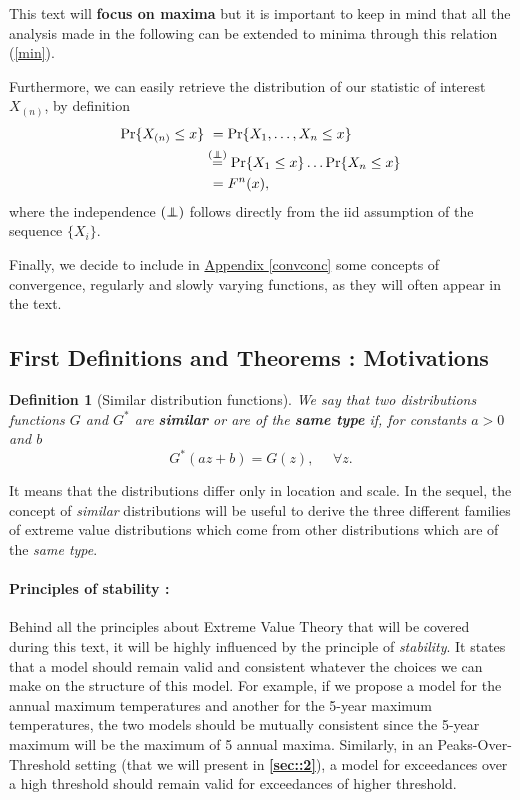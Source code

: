 \documentclass[11pt,a4paper,openany ]{book}
\newcommand\independent{\protect\mathpalette{\protect\independenT}{\perp}}
\def\independenT#1#2{\mathrel{\rlap{$#1#2$}\mkern2mu{#1#2}}}
\newtheorem{definition}{Definition}[chapter]
\begin{document}
This text will \textbf{focus on maxima} but it is important to keep in mind that all the analysis made in the following can be extended to minima through this relation (\ref{min}).

Furthermore, we can easily retrieve the distribution of our statistic of interest $X_{(n)}$, by definition
\begin{equation}\label{maxdist}
\begin{aligned}
\text{Pr}\{X_{(n)}\leq x\} & \ =\text{Pr}\{X_1,\dots,X_n\leq x\} \\ &\stackrel{(\independent)}{=}\text{Pr}\{X_1\leq x\}\dots\text{Pr}\{X_n\leq x\} \\
&\ =F^n(x),
\end{aligned}
\end{equation}
where the independence $(\independent)$  follows directly from the iid assumption of the sequence $\{X_i\}$.


Finally, we decide to include in \hyperref[convconc]{Appendix \ref{convconc}} some concepts of convergence, regularly and slowly varying functions, as they will often 
appear in the text.


\subsection*{First Definitions and Theorems : Motivations}
\theoremstyle{definition}
\begin{definition}[Similar distribution functions]\label{similardf} We say that two distributions functions $G$ and $G^*$ are \emph{\textbf{similar}} or are of the \emph{\textbf{same type}}
	if, for constants $a>0$ and $b$
	\begin{equation}\label{simm}
	G^*(az+b)=G(z), \ \ \ \ \ \ \forall z.
	\end{equation}
\end{definition}
It means that the distributions differ only in location and scale. 
In the sequel, the concept of \emph{similar} distributions will be useful to derive the three different families of extreme value distributions which come from other distributions which are of the \emph{same type}.


\paragraph*{Principles of stability :}
Behind all the principles about Extreme Value Theory that will be covered during this text, it will be highly influenced by the principle of \emph{stability}. It states that a model should remain valid and consistent whatever the choices we can make on the structure of this model.
For example, if we propose a model for the annual maximum temperatures and another for the 5-year maximum temperatures, the two models should be mutually consistent since the 5-year maximum will be the maximum of 5 annual maxima. Similarly, in an Peaks-Over-Threshold setting (that we will present in \hyperref[sec::2]{\textbf{\ref{sec::2}}}), a model for exceedances over a high threshold should remain valid for exceedances of higher threshold. 
\end{document}
